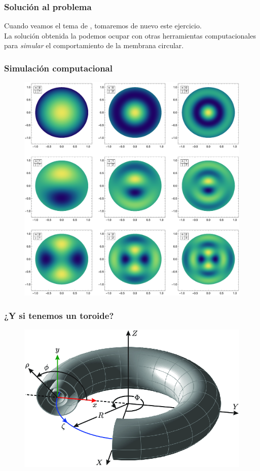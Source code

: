 \documentclass[12pt]{beamer}
\begin{document}
\begin{frame}
\frametitle{Solución al problema}
Cuando veamos el tema de , tomaremos de nuevo este ejercicio.
\\
\bigskip
\pause
La solución obtenida la podemos ocupar con otras herramientas computacionales para \emph{simular} el comportamiento de la membrana circular.
\end{frame}
\begin{frame}
\frametitle{Simulación computacional}
\begin{figure}[h!]
    \centering
    \includegraphics[scale=0.32]{Imagenes/Modos_Vibracion_Membrana_Circular_01.eps}
\end{figure}
\end{frame}
\begin{frame}
\frametitle{¿Y si tenemos un toroide?}
\begin{figure}
    \centering
    \includegraphics[scale=0.4]{Imagenes/Geometria_Toro.png}
\end{figure}
\end{frame}
\end{document}
